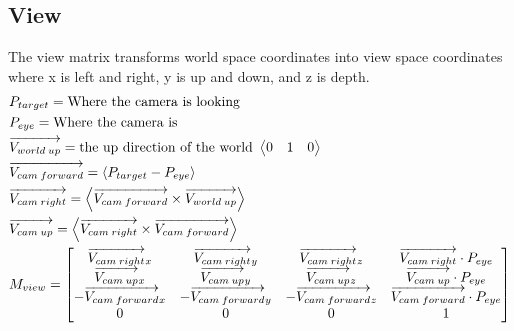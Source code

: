 \documentclass[12pt]{article}
\begin{document}
\subsection{View}
The view matrix transforms world space coordinates into view space coordinates where x is left and right, y is up and down, and z is depth.
\begin{gather*}\begin{align}
	&P_{target} = \text{Where the camera is looking} \notag\\
	&P_{eye} = \text{Where the camera is} \notag\\
	&\overrightarrow{V_{world\hspace{0.2em}up}} = \text{the up direction of the world }\left\langle \begin{matrix}0&1&0\end{matrix} \right\rangle \notag\\
	&\overrightarrow{V_{cam\hspace{0.2em}forward}} = \left\langle P_{target}-P_{eye} \right\rangle \notag\\
	&\overrightarrow{V_{cam\hspace{0.2em}right}} = \left\langle \overrightarrow{V_{cam\hspace{0.2em}forward}}\times  \overrightarrow{V_{world\hspace{0.2em}up}}\right\rangle \notag\\
	&\overrightarrow{V_{cam\hspace{0.2em}up}} = \left\langle \overrightarrow{V_{cam\hspace{0.2em}right}}\times  \overrightarrow{V_{cam\hspace{0.2em}forward}}\right\rangle \notag\\
	&M_{view}= 
	\begin{bmatrix}
		\overrightarrow{V_{cam\hspace{0.2em}right}}_x&\overrightarrow{V_{cam\hspace{0.2em}right}}_y&\overrightarrow{V_{cam\hspace{0.2em}right}}_z&\overrightarrow{V_{cam\hspace{0.2em}right}}\cdot P_{eye}\\
		\overrightarrow{V_{cam\hspace{0.2em}up}}_x&\overrightarrow{V_{cam\hspace{0.2em}up}}_y&\overrightarrow{V_{cam\hspace{0.2em}up}}_z&\overrightarrow{V_{cam\hspace{0.2em}up}}\cdot P_{eye}\\
		-\overrightarrow{V_{cam\hspace{0.2em}forward}}_x&-\overrightarrow{V_{cam\hspace{0.2em}forward}}_y&-\overrightarrow{V_{cam\hspace{0.2em}forward}}_z&\overrightarrow{V_{cam\hspace{0.2em}forward}}\cdot P_{eye}\\
		0&0&0&1
	\end{bmatrix}
\end{align}\end{gather*}
\end{document}
